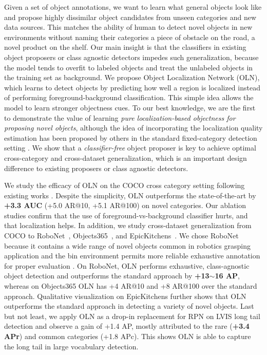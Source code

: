 \documentclass[10pt,twocolumn,letterpaper]{article}
\newcommand{\OURS}{OLN}
\begin{document}
Given a set of object annotations, we want to learn what general objects look like and propose highly dissimilar object candidates from unseen categories and new data sources. This matches the ability of human to detect novel objects in new environments without naming their categories \eg a piece of obstacle on the road, a novel product on the shelf. Our main insight is that the classifiers in existing object proposers \cite{kuo2015deepbox,pinheiro2015learning,vu2019cascade} or class agnostic detectors \cite{fasterNIPS2015,tian2019fcos} impedes such generalization, because the model tends to overfit to labeled objects and treat the unlabeled objects in the training set as background. We propose Object Localization Network (OLN), which learns to detect objects by predicting how well a region is localized instead of performing foreground-background classification. This simple idea allows the model to learn stronger objectness cues. To our best knowledge, we are the first to demonstrate the value of learning \textit{pure localization-based objectness for proposing novel objects}, although the idea of incorporating the localization quality estimation has been proposed by others in the standard fixed-category detection setting \cite{huang2019mask,jiang2018acquisition,tian2019fcos,wu2020iou}. We show that a \textit{classifier-free} object proposer is  key to achieve optimal cross-category and cross-dataset generalization, which is an important design difference to existing proposers or class agnostic detectors.

We study the efficacy of \OURS{} on the COCO cross category setting following existing works \cite{kuo2015deepbox,pinheiro2015learning,wang2020leads}. Despite the simplicity, OLN outperforms the state-of-the-art by \textbf{+3.3 AUC} (+5.0 AR@10, +5.1 AR@100) on novel categories. Our ablation studies confirm that the use of foreground-vs-background classifier hurts, and that localization helps. In addition, we study cross-dataset generalization from COCO to RoboNet~\cite{dasari2019robonet}, Objects365~\cite{shao2019objects365}, and EpicKitchens~\cite{Damen2020Collection}. We chose RoboNet because it contains a wide range of novel objects common in robotics grasping application and the bin environment permits more reliable exhaustive annotation for proper evaluation \cite{chavali2016object}. On RoboNet, \OURS{} performs exhaustive, class-agnostic object detection and outperforms the standard approach by \textbf{+13$\sim$16 AP}, whereas on Objects365 \OURS{} has +4 AR@10 and +8 AR@100 over the standard approach. Qualitative visualization on EpicKitchens \cite{Damen2020Collection} further shows that \OURS{} outperforms the standard approach in detecting a variety of novel objects. Last but not least, we apply \OURS{} as a drop-in replacement for RPN\cite{fasterNIPS2015} on LVIS long tail detection \cite{gupta2019lvis} and observe a gain of +1.4 AP, mostly attributed to the rare (\textbf{+3.4 APr}) and common categories (+1.8 APc). This shows \OURS{} is able to capture the long tail in large vocabulary detection. 
\end{document}
